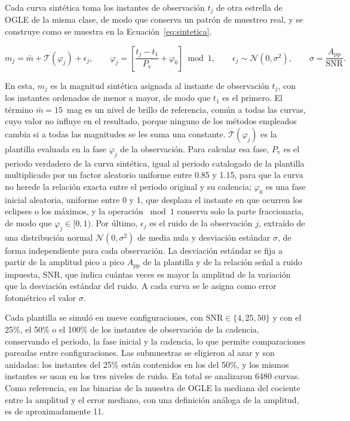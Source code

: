 \documentclass[12pt,letterpaper,oneside]{book}
\begin{document}
Cada curva sint\'etica toma los instantes de observaci\'on $t_j$ de otra estrella de OGLE de la misma clase, de modo que conserva un patr\'on de muestreo real, y se construye como se muestra en la Ecuaci\'on~\eqref{eq:sintetica}.

\begin{equation}
	m_j = \bar m + \mathcal{T}(\varphi_j) + \epsilon_j, \qquad \varphi_j = \left[\frac{t_j - t_1}{P_{\mathrm{v}}} + \varphi_0\right] \bmod 1, \qquad \epsilon_j \sim \mathcal{N}(0, \sigma^2), \qquad \sigma = \frac{A_{\mathrm{pp}}}{\mathrm{SNR}}.
	\label{eq:sintetica}
\end{equation}

En esta, $m_j$ es la magnitud sint\'etica asignada al instante de observaci\'on $t_j$, con los instantes ordenados de menor a mayor, de modo que $t_1$ es el primero. El t\'ermino $\bar m=15$~mag es un nivel de brillo de referencia, com\'un a todas las curvas, cuyo valor no influye en el resultado, porque ninguno de los m\'etodos empleados cambia si a todas las magnitudes se les suma una constante. $\mathcal{T}(\varphi_j)$ es la plantilla evaluada en la fase $\varphi_j$ de la observaci\'on. Para calcular esa fase, $P_{\mathrm{v}}$ es el periodo verdadero de la curva sint\'etica, igual al periodo catalogado de la plantilla multiplicado por un factor aleatorio uniforme entre 0.85 y 1.15, para que la curva no herede la relaci\'on exacta entre el periodo original y su cadencia; $\varphi_0$ es una fase inicial aleatoria, uniforme entre 0 y 1, que desplaza el instante en que ocurren los eclipses o los m\'aximos, y la operaci\'on $\bmod 1$ conserva solo la parte fraccionaria, de modo que $\varphi_j\in[0,1)$. Por \'ultimo, $\epsilon_j$ es el ruido de la observaci\'on $j$, extra\'ido de una distribuci\'on normal $\mathcal{N}(0,\sigma^2)$ de media nula y desviaci\'on est\'andar $\sigma$, de forma independiente para cada observaci\'on. La desviaci\'on est\'andar se fija a partir de la amplitud pico a pico $A_{\mathrm{pp}}$ de la plantilla y de la relaci\'on se\~nal a ruido impuesta, SNR, que indica cu\'antas veces es mayor la amplitud de la variaci\'on que la desviaci\'on est\'andar del ruido. A cada curva se le asigna como error fotom\'etrico el valor $\sigma$.

Cada plantilla se simul\'o en nueve configuraciones, con $\mathrm{SNR}\in\{4,25,50\}$ y con el 25\%, el 50\% o el 100\% de los instantes de observaci\'on de la cadencia, conservando el periodo, la fase inicial y la cadencia, lo que permite comparaciones pareadas entre configuraciones. Las submuestras se eligieron al azar y son anidadas: los instantes del 25\% est\'an contenidos en los del 50\%, y los mismos instantes se usan en los tres niveles de ruido. En total se analizaron 6480 curvas. Como referencia, en las binarias de la muestra de OGLE la mediana del cociente entre la amplitud y el error mediano, con una definici\'on an\'aloga de la amplitud, es de aproximadamente 11.
\end{document}
